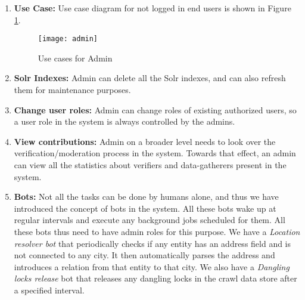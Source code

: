 \begin{enumerate}
    \item \textbf{Use Case:} Use case diagram for not logged in end users is shown in Figure \ref{fig:admin}.

    \begin{figure}[H]
    \begin{center}  
    \texttt{[image: admin]} 
    \caption{Use cases for Admin}
    \label{fig:admin}
    \end{center}
    \end{figure}
    

     \item \textbf{Solr Indexes:} Admin can delete all the Solr indexes, and can also refresh them for maintenance purposes.

     \item \textbf{Change user roles:} Admin can change roles of existing authorized users, so a user role in the system is always controlled by the admins.


     \item \textbf{View contributions:} Admin on a broader level needs to look over the verification/moderation process in the system. Towards that effect, an admin can view all the statistics about verifiers and data-gatherers present in the system.

     \item \textbf{Bots:} Not all the tasks can be done by humans alone, and thus we have introduced the concept of bots in the system. All these bots wake up at regular intervals and execute any background jobs scheduled for them. All these bots thus need to have admin roles for this purpose. We have a \emph{Location resolver bot} that periodically checks if any entity has an address field and is not connected to any city. It then automatically parses the address and introduces a relation from that entity to that city. We also have a \emph{Dangling locks release} bot that releases any dangling locks in the crawl data store after a specified interval.   

\end{enumerate}